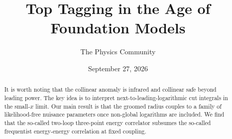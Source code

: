 \documentclass[11pt]{article}
\title{Top Tagging in the Age of Foundation Models}
\author{The Physics Community}
\date{September 27, 2026}
\numberwithin{equation}{section}
\theoremstyle{definition}
\theoremstyle{remark}
\begin{document}
\maketitle
\begin{abstract}
It is worth noting that the collinear anomaly is infrared and collinear
safe beyond leading power. The key idea is to interpret
next-to-leading-logarithmic cut integrals in the small-$x$ limit. Our
main result is that the groomed radius couples to a family of
likelihood-free nuisance parameters once non-global logarithms are
included. We find that the so-called two-loop three-point energy
correlator subsumes the so-called frequentist energy-energy correlation
at fixed coupling.
\end{abstract}
\tableofcontents




\nocite{*}


\end{document}

